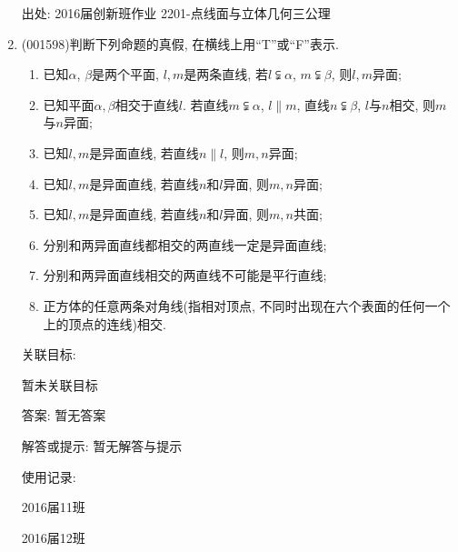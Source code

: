 \documentclass[10pt,a4paper]{article}
\newcommand{\blank}[1]{\underline{\hbox to #1pt{}}}
\begin{document}
\begin{enumerate}[1.]
出处: 2016届创新班作业	2201-点线面与立体几何三公理
\item { (001598)}判断下列命题的真假, 在横线上用``T''或``F''表示.
\begin{enumerate}[\blank{30}(1)]
\item 已知$\alpha$, $\beta$是两个平面, $l,m$是两条直线, 若$l\subsetneqq \alpha$, $m\subsetneqq \beta$, 则$l,m$异面;\\ 
\item 已知平面$\alpha,\beta$相交于直线$l$. 若直线$m\subsetneqq \alpha$, $l \parallel m$, 直线$n\subsetneqq \beta$, $l$与$n$相交, 则$m$与$n$异面;\\ 
\item 已知$l,m$是异面直线, 若直线$n\parallel l$, 则$m,n$异面;\\ 
\item 已知$l,m$是异面直线, 若直线$n$和$l$异面, 则$m,n$异面;\\ 
\item 已知$l,m$是异面直线, 若直线$n$和$l$异面, 则$m,n$共面;\\ 
\item 分别和两异面直线都相交的两直线一定是异面直线;\\ 
\item 分别和两异面直线相交的两直线不可能是平行直线;\\ 
\item 正方体的任意两条对角线(指相对顶点, 不同时出现在六个表面的任何一个上的顶点的连线)相交.\\ 
\end{enumerate}


关联目标:

暂未关联目标

答案: 暂无答案

解答或提示: 暂无解答与提示

使用记录:

2016届11班								

2016届12班								



\end{enumerate}
\end{document}

